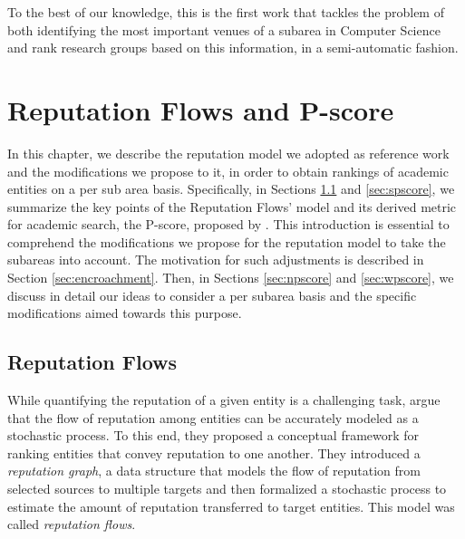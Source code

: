 \documentclass[msc]{ppgccufmg}
\begin{document}
To the best of our knowledge, this is the first work that tackles the problem of both identifying the most important venues of a subarea in Computer Science and rank research groups based on this information, in a semi-automatic fashion.




\chapter{Reputation Flows and P-score}\label{sec:pscore} 


In this chapter, we describe the reputation model we adopted as reference work and the modifications we propose to it, in order to obtain rankings of academic entities on a per sub area basis. Specifically, in Sections \ref{sec:flows} and \ref{sec:spscore}, we summarize the key points of the Reputation Flows' model and its derived metric for academic search, the P-score, proposed by \cite{ribas2015bigscholar,ribas2015random}. This introduction is essential to comprehend the modifications we propose for the reputation model to take the subareas into account. The motivation for such adjustments is described in Section \ref{sec:encroachment}. Then, in Sections \ref{sec:npscore} and \ref{sec:wpscore}, we discuss in detail our ideas to consider a per subarea basis and the specific modifications aimed towards this purpose.

\section{Reputation Flows}\label{sec:flows}

While quantifying the reputation of a given entity is a challenging task, \cite{ribas2015random} argue that the flow of reputation among entities can be accurately modeled as a stochastic process. To this end, they proposed a conceptual framework for ranking entities that convey reputation to one another. They introduced a \textit{reputation graph}, a data structure that models the flow of reputation from selected sources to multiple targets and then formalized a stochastic process to estimate the amount of reputation transferred to target entities. This model was called \textit{reputation flows}.
\end{document}
